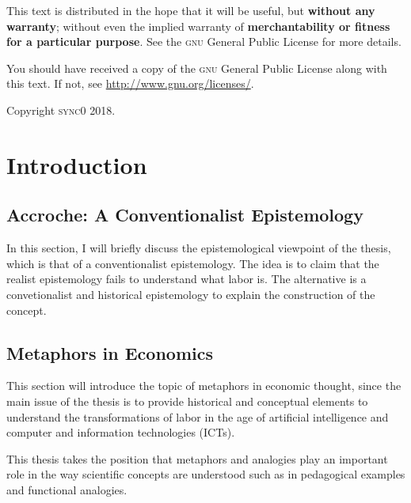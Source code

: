\documentclass[version=last,draft=false,paper=A4,portrait,twoside=true,twocolumn=true,headinclude=false,footinclude=false,fontsize=12,BCOR=20mm,DIV=13,pagesize=auto,titlepage=firstiscover,mpinclude=false,open=right,chapterprefix=true,numbers=autoendperiod,headsepline=false,parskip=false]{scrbook}
\begin{document}
This text is distributed in the hope that it will be useful, but \textbf{without
any warranty}; without even the implied warranty of \textbf{merchantability or 
fitness for a particular purpose}. See the \textsc{gnu} General 
Public License for more details.

You should have received a copy of the \textsc{gnu} General Public License along
with this text. If not, see \url{http://www.gnu.org/licenses/}.

\vspace{1\baselineskip}
\noindent
Copyright \textcopyright \textsc{sync0} 2018. 




\newpage
\tableofcontents 
\nocite{*}
\chapter{Introduction}
\label{sec:orgbbd7125}
\section{Accroche: A Conventionalist Epistemology}
\label{sec:org7b0274a}
In this section, I will briefly discuss the epistemological viewpoint of
the thesis, which is that of a conventionalist epistemology. The idea is to
claim that the realist epistemology fails to understand what labor is. The
alternative is a convetionalist and historical epistemology to explain the
construction of the concept.

\section{Metaphors in Economics}
\label{sec:org4dc7e4b}
This section will introduce the topic of metaphors in economic thought,
since the main issue of the thesis is to provide historical and conceptual
elements to understand the transformations of labor in the age of
artificial intelligence and computer and information technologies (ICTs). 

This thesis takes the position that metaphors and analogies play an
important role in the way scientific concepts are understood such as in
pedagogical examples and functional analogies. 
\end{document}
